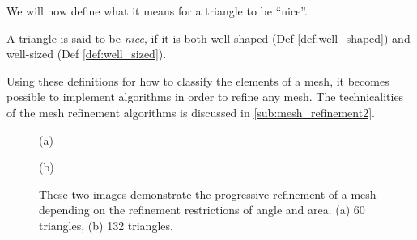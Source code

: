 \documentclass[../fem.tex]{subfile}
\begin{document}
We will now define what it means for a triangle to be ``nice''.

\begin{definition}[nice] \label{def:nice_tri}
  A triangle is said to be \textit{nice}, if it is both well-shaped (Def
  \ref{def:well_shaped}) and well-sized (Def \ref{def:well_sized}).
\end{definition}

Using these definitions for how to classify the elements of a mesh, it becomes
possible to implement algorithms in order to refine any mesh. The
technicalities of the mesh refinement algorithms is discussed in
\ref{sub:mesh_refinement2}.

\begin{figure}[htpb]
  \centering
     \begin{minipage}{0.4\textwidth}
     \begin{center}
       
       (a)
     \end{center}
   \end{minipage}
   \begin{minipage}{0.4\textwidth}
     \begin{center}
       
       (b)
     \end{center}
   \end{minipage}
  \caption{These two images demonstrate the progressive refinement of a mesh
  depending on the refinement restrictions of angle and area. (a) 60 triangles,
(b) 132 triangles.}
  \label{fig:name}
\end{figure}
\end{document}

